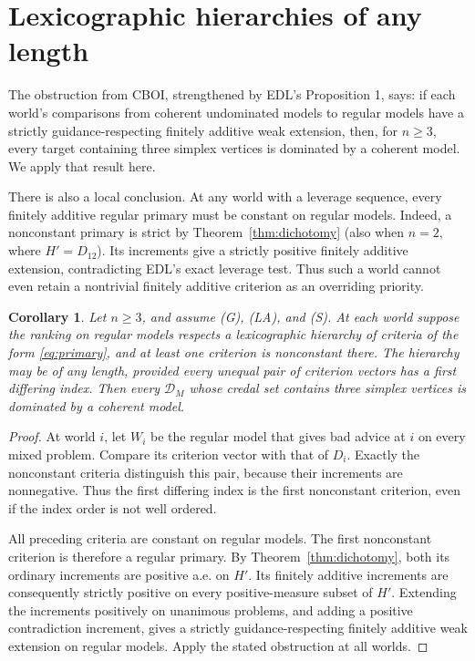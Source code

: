 \documentclass[11pt]{article}
\newtheorem{corollary}[theorem]{Corollary}
\theoremstyle{remark}\newtheorem{remark}[theorem]{Remark}
\newcommand{\Dscr}{\mathcal D}
\begin{document}
\section{Lexicographic hierarchies of any length}

The obstruction from CBOI, strengthened by EDL's Proposition 1, says:
if each world's comparisons from coherent undominated models to regular
models have a strictly guidance-respecting finitely additive weak extension,
then, for $n\ge3$, every target containing three simplex vertices is
dominated by a coherent model. We apply that result here.

There is also a local conclusion. At any world with a leverage sequence,
every finitely additive regular primary must be constant on regular models.
Indeed, a nonconstant primary is strict by Theorem~\ref{thm:dichotomy}
(also when $n=2$, where $H'=D_{12}$). Its increments give a strictly
positive finitely additive extension, contradicting EDL's exact leverage
test. Thus such a world cannot even retain a nontrivial finitely additive
criterion as an overriding priority.

\begin{corollary}\label{cor:lex}
Let $n\ge3$, and assume (G), (LA), and (S). At each world suppose the ranking
on regular models respects a lexicographic hierarchy of criteria of the
form \eqref{eq:primary}, and at least one criterion is nonconstant there.
The hierarchy may be of any length, provided every unequal pair of criterion
vectors has a first differing index. Then every $\Dscr_M$ whose credal set
contains three simplex vertices is dominated by a coherent model.
\end{corollary}
\begin{proof}
At world $i$, let $W_i$ be the regular model that gives bad advice at $i$
on every mixed problem. Compare its criterion vector with that of $D_i$.
Exactly the nonconstant criteria distinguish this pair, because their
increments are nonnegative. Thus the first differing index is the first
nonconstant criterion, even if the index order is not well ordered.

All preceding criteria are constant on regular models. The first
nonconstant criterion is therefore a regular primary. By
Theorem~\ref{thm:dichotomy}, both its ordinary increments are positive
a.e. on $H'$. Its finitely additive increments are consequently strictly
positive on every positive-measure subset of $H'$.
Extending the increments positively on unanimous problems, and adding a
positive contradiction increment, gives a strictly guidance-respecting
finitely additive weak extension on regular models. Apply the stated
obstruction at all worlds.
\end{proof}
\end{document}

